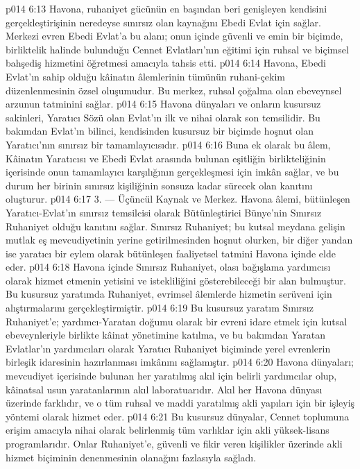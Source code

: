\vs p014 6:13 Havona, ruhaniyet gücünün en başından beri genişleyen kendisini gerçekleştirişinin neredeyse sınırsız olan kaynağını Ebedi Evlat için sağlar. Merkezi evren Ebedi Evlat’a bu alanı; onun içinde güvenli ve emin bir biçimde, birliktelik halinde bulunduğu Cennet Evlatları’nın eğitimi için ruhsal ve biçimsel bahşediş hizmetini öğretmesi amacıyla tahsis etti.
\vs p014 6:14 Havona, Ebedi Evlat’ın sahip olduğu kâinatın âlemlerinin tümünün ruhani\hyp{}çekim düzenlenmesinin özsel oluşumudur. Bu merkez, ruhsal çoğalma olan ebeveynsel arzunun tatminini sağlar.
\vs p014 6:15 Havona dünyaları ve onların kusursuz sakinleri, Yaratıcı Sözü olan Evlat’ın ilk ve nihai olarak son temsilidir. Bu bakımdan Evlat’ın bilinci, kendisinden kusursuz bir biçimde hoşnut olan Yaratıcı’nın sınırsız bir tamamlayıcısıdır.
\vs p014 6:16 Buna ek olarak bu âlem, Kâinatın Yaratıcısı ve Ebedi Evlat arasında bulunan eşitliğin birlikteliğinin içerisinde onun tamamlayıcı karşılığının gerçekleşmesi için imkân sağlar, ve bu durum her birinin sınırsız kişiliğinin sonsuza kadar sürecek olan kanıtını oluşturur.
\vs p014 6:17 3. --- Üçüncül Kaynak ve Merkez. Havona âlemi, bütünleşen Yaratıcı\hyp{}Evlat’ın sınırsız temsilcisi olarak Bütünleştirici Bünye’nin Sınırsız Ruhaniyet olduğu kanıtını sağlar. Sınırsız Ruhaniyet; bu kutsal meydana gelişin mutlak eş mevcudiyetinin yerine getirilmesinden hoşnut olurken, bir diğer yandan ise yaratıcı bir eylem olarak bütünleşen faaliyetsel tatmini Havona içinde elde eder.
\vs p014 6:18 Havona içinde Sınırsız Ruhaniyet, olası bağışlama yardımcısı olarak hizmet etmenin yetisini ve istekliliğini gösterebileceği bir alan bulmuştur. Bu kusursuz yaratımda Ruhaniyet, evrimsel âlemlerde hizmetin serüveni için alıştırmalarını gerçekleştirmiştir.
\vs p014 6:19 Bu kusursuz yaratım Sınırsız Ruhaniyet’e; yardımcı\hyp{}Yaratan doğumu olarak bir evreni idare etmek için kutsal ebeveynleriyle birlikte kâinat yönetimine katılma, ve bu bakımdan Yaratan Evlatlar’ın yardımcıları olarak Yaratıcı Ruhaniyet biçiminde yerel evrenlerin birleşik idaresinin hazırlanması imkânını sağlamıştır.
\vs p014 6:20 Havona dünyaları; mevcudiyet içerisinde bulunan her yaratılmış akıl için belirli yardımcılar olup, kâinatsal usun yaratanlarının akıl laboratuarıdır. Akıl her Havona dünyası üzerinde farklıdır, ve o tüm ruhsal ve maddi yaratılmış akli yapıları için bir işleyiş yöntemi olarak hizmet eder.
\vs p014 6:21 Bu kusursuz dünyalar, Cennet toplumuna erişim amacıyla nihai olarak belirlenmiş tüm varlıklar için akli yüksek\hyp{}lisans programlarıdır. Onlar Ruhaniyet’e, güvenli ve fikir veren kişilikler üzerinde akli hizmet biçiminin denenmesinin olanağını fazlasıyla sağladı.
